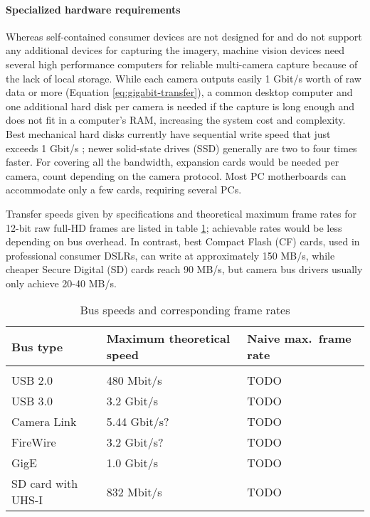 \paragraph{Specialized hardware requirements}
Whereas self-contained consumer devices are not designed for and do not support any additional devices for capturing the imagery, machine vision devices need several high performance computers for reliable multi-camera capture because of the lack of local storage.
While each camera outputs easily 1 Gbit/s worth of raw data or more (Equation \ref{eq:gigabit-transfer}), a common desktop computer and one additional hard disk per camera is needed if the capture is long enough and does not fit in a computer's RAM, increasing the system cost and complexity.
Best mechanical hard disks currently have sequential write speed that just exceeds 1 Gbit/s \cite{wdtaijotain};
newer solid-state drives (SSD) generally are two to four times faster. \cite{todo}
For covering all the bandwidth, expansion cards would be needed per camera, count depending on the camera protocol.
Most PC motherboards can accommodate only a few cards, requiring several PCs.

Transfer speeds given by specifications and theoretical maximum frame rates for 12-bit raw full-HD frames are listed in table \ref{tab:busspeeds}; achievable rates would be less depending on bus overhead.
In contrast, best Compact Flash (CF) cards, used in professional consumer DSLRs, can write at approximately 150 MB/s, while cheaper Secure Digital (SD) cards reach 90 MB/s, but camera bus drivers usually only achieve 20-40 MB/s. \cite{todo} %

\begin{table}[h]
	\centering
	\begin{tabular}{l l l}
		Bus type & Maximum theoretical speed & Naive max.\ frame rate\\
		\hline \\
		USB 2.0 & 480 Mbit/s & TODO\\
		USB 3.0 & 3.2 Gbit/s & TODO\\
		Camera Link & 5.44 Gbit/s? & TODO\\
		FireWire & 3.2 Gbit/s? & TODO\\
		GigE & 1.0 Gbit/s & TODO\\
		SD card with UHS-I & 832 Mbit/s & TODO\\
	\end{tabular}
	\caption{Bus speeds and corresponding frame rates}
	\label{tab:busspeeds}
\end{table}

